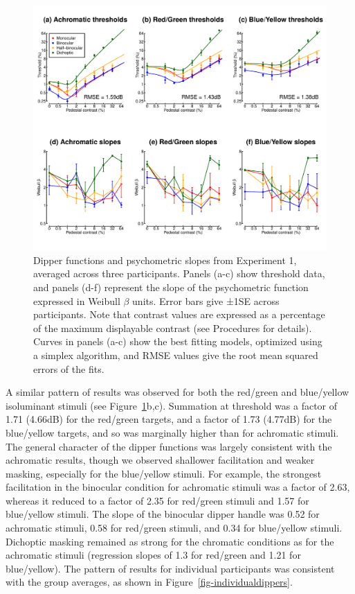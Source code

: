 \documentclass[
  letterpaper,
  DIV=11,
  numbers=noendperiod]{scrartcl}
\begin{document}
\begin{figure}

{\centering \includegraphics{Figures/dipperssimplex.pdf}

}

\caption{\label{fig-dipperfig}Dipper functions and psychometric slopes
from Experiment 1, averaged across three participants. Panels (a-c) show
threshold data, and panels (d-f) represent the slope of the psychometric
function expressed in Weibull \(\beta\) units. Error bars give ±1SE
across participants. Note that contrast values are expressed as a
percentage of the maximum displayable contrast (see Procedures for
details). Curves in panels (a-c) show the best fitting models, optimized
using a simplex algorithm, and RMSE values give the root mean squared
errors of the fits.}

\end{figure}

A similar pattern of results was observed for both the red/green and
blue/yellow isoluminant stimuli (see Figure~\ref{fig-dipperfig}b,c).
Summation at threshold was a factor of 1.71 (4.66dB) for the red/green
targets, and a factor of 1.73 (4.77dB) for the blue/yellow targets, and
so was marginally higher than for achromatic stimuli. The general
character of the dipper functions was largely consistent with the
achromatic results, though we observed shallower facilitation and weaker
masking, especially for the blue/yellow stimuli. For example, the
strongest facilitation in the binocular condition for achromatic stimuli
was a factor of 2.63, whereas it reduced to a factor of 2.35 for
red/green stimuli and 1.57 for blue/yellow stimuli. The slope of the
binocular dipper handle was 0.52 for achromatic stimuli, 0.58 for
red/green stimuli, and 0.34 for blue/yellow stimuli. Dichoptic masking
remained as strong for the chromatic conditions as for the achromatic
stimuli (regression slopes of 1.3 for red/green and 1.21 for
blue/yellow). The pattern of results for individual participants was
consistent with the group averages, as shown in
Figure~\ref{fig-individualdippers}.
\end{document}
